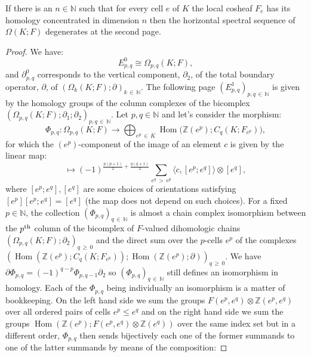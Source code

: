 \documentclass[AHL,Unicode,longabstracts,published]{cedram}
\newcommand{\Z}{\mathbb{Z}}
\newcommand{\N}{\mathbb{N}}
\DeclareMathOperator{\Hom}{Hom}
\begin{document}
\begin{prop}\label{prp:degenerate_E2_lef}
If there is an $n\in\N$ such that for every cell $e$ of $K$ the local cosheaf $F_e$ has its homology concentrated in dimension $n$ then the horizontal spectral sequence of $\Omega(K;F)$ degenerates at the second page.
\end{prop}

\begin{proof}
We have:
\begin{equation*}
E^0_{p,q}\cong \Omega_{p,q}(K;F),
\end{equation*}
and $\partial^0_{p,q}$ corresponds to the vertical component, $\partial_2$, of the total boundary operator, $\partial$, of $(\Omega_{k}(K;F);\partial)_{k\,\in\,\N}$. The following page $(E^1_{p,q})_{p,q\,\in\,\N}$ is given by the homology groups of the column complexes of the bicomplex $(\Omega_{p,q}(K;F);\partial_1;\partial_2)_{p,q\,\in\,\N}$. Let $p,q\in\N$ and let's consider the morphism:
\begin{equation*}
\Phi_{p,q} : \Omega_{p,q}(K;F) \rightarrow \bigoplus_{e^p\,\in\,K}\Hom\big(\Z(e^p);C_q(K;F_{e^p})\big),
\end{equation*}
for which the $(e^p)$-component of the image of an element $c$ is given by the linear map:
\begin{equation*}
[e^p]\mapsto (-1)^{\frac{p(p+1)}{2}+\frac{q(q+1)}{2}}\sum_{e^q\,>\,e^p}\langle c,[e^p;e^q]\rangle\otimes[e^q],
\end{equation*}
where $[e^p;e^q],[e^q]$ are some choices of orientations satisfying $[e^p][e^p;e^q]=[e^q]$ (the map does not depend on such choices). For a fixed $p\in\N$, the collection $(\Phi_{p,q})_{q\,\in\,\N}$ is almost a chain complex isomorphism between the $p^{\rm th}$ column of the bicomplex of $F$-valued dihomologic chains $(\Omega_{p,q}(K;F);\partial_2)_{q\,\geq\,0}$ and the direct sum over the $p$-cells $e^p$ of the complexes $(\Hom(\Z(e^p);C_q(K;F_{e^p}));\Hom(\Z(e^p);\partial))_{q\,\geq\,0}$. We have $\partial\Phi_{p,q}=(-1)^{q-p}\Phi_{p,q-1}\partial_2$ so $(\Phi_{p,q})_{q\,\in\,\N}$ still defines an isomorphism in homology. Each of the $\Phi_{p,q}$ being individually an isomorphism is a matter of bookkeeping. On the left hand side we sum the groups $F(e^p,e^q)\otimes \Z(e^p,e^q)$ over all ordered pairs of cells $e^p\leq e^q$ and on the right hand side we sum the groups $\Hom(\Z(e^p);F(e^p,e^q)\otimes\Z(e^q))$ over the same index set but in a different order, $\Phi_{p,q}$ then sends bijectively each one of the former summands to one of the latter summands by means of the composition:

\end{proof}
\end{document}

